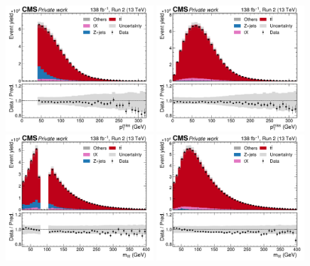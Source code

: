 \begin{figure}[!hp]
    \centering
    \includegraphics[width=0.49\textwidth]{figures/ah/controlplots/ReqMET/sf/METpt_ReqMET_sf.pdf}
    \hfill
    \includegraphics[width=0.49\textwidth]{figures/ah/controlplots/ReqMET/em/METpt_ReqMET_em.pdf}
    \includegraphics[width=0.49\textwidth]{figures/ah/controlplots/ReqMET/sf/mll_ReqMET_sf.pdf}
    \hfill
    \includegraphics[width=0.49\textwidth]{figures/ah/controlplots/ReqMET/em/mll_ReqMET_em.pdf}

\end{figure}

